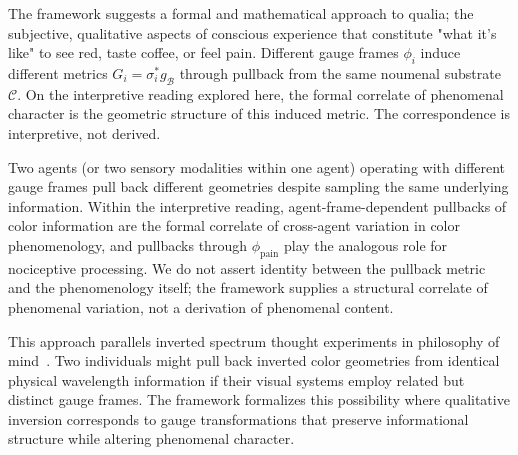 \documentclass[11pt]{article}
\begin{document}
The framework suggests a formal and mathematical approach to qualia; the subjective, qualitative aspects of conscious experience that constitute "what it's like" to see red, taste coffee, or feel pain. Different gauge frames $\phi_i$ induce different metrics $G_i = \sigma_i^* g_{\mathcal{B}}$ through pullback from the same noumenal substrate $\mathcal{C}$. On the interpretive reading explored here, the formal correlate of phenomenal character is the geometric structure of this induced metric. The correspondence is interpretive, not derived.

Two agents (or two sensory modalities within one agent) operating with different gauge frames pull back different geometries despite sampling the same underlying information. Within the interpretive reading, agent-frame-dependent pullbacks of color information are the formal correlate of cross-agent variation in color phenomenology, and pullbacks through $\phi_{\text{pain}}$ play the analogous role for nociceptive processing. We do not assert identity between the pullback metric and the phenomenology itself; the framework supplies a structural correlate of phenomenal variation, not a derivation of phenomenal content.

This approach parallels inverted spectrum thought experiments in philosophy of mind~\cite{Shoemaker1982}. Two individuals might pull back inverted color geometries from identical physical wavelength information if their visual systems employ related but distinct gauge frames. The framework formalizes this possibility where qualitative inversion corresponds to gauge transformations that preserve informational structure while altering phenomenal character.
\end{document}
